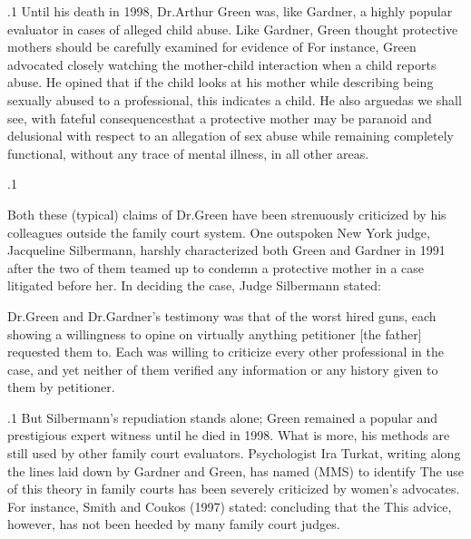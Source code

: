 \documentclass[11pt, twoside]{article}
\begin{document}
{\p.1{%
Until his death in 1998, Dr.\@ Arthur Green was, like Gardner, a highly
popular evaluator in cases of alleged child abuse. Like Gardner, Green
thought protective mothers should be carefully examined for evidence
of  For instance, Green advocated closely watching the
mother-child interaction when a child reports abuse. He opined that if
the child looks at his mother while describing being sexually abused to
a professional, this indicates a  child. He also argued\mdash{}as
we shall see, with fateful consequences\mdash{}that a protective mother may be
paranoid and delusional with respect to an allegation of sex abuse while
remaining completely functional, without any trace of mental illness, in
all other areas.
}%

\p.1{%
Both these (typical) claims of Dr.\@ Green have been strenuously criticized by his colleagues outside the family court system. One outspoken
New York judge, Jacqueline Silbermann, harshly characterized both
Green and Gardner in 1991 after the two of them teamed up to condemn a protective mother in a case litigated before her. In deciding the
case, Judge Silbermann stated:

\begin{blockQuote}
Dr.\@ Green and Dr.\@ Gardner’s testimony was that of the worst hired
guns, each showing a willingness to opine on virtually anything
petitioner [the father] requested them to. Each was willing to
criticize every other professional in the case, and yet neither of
them verified any information or any history given to them by
petitioner.
\end{blockQuote}

}%

\p.1{%
But Silbermann’s repudiation stands alone; Green remained a popular
and prestigious expert witness until he died in 1998. What is more, his
methods are still used by other family court evaluators.
Psychologist Ira Turkat, writing along the lines laid down by Gardner
and Green, has named  (MMS) to identify
 The use of this theory in family courts has been severely criticized by women’s advocates. For instance, Smith and Coukos (1997)
stated:  concluding that the
 This advice, however, has not been
heeded by many family court judges.
}%

}
\end{document}

